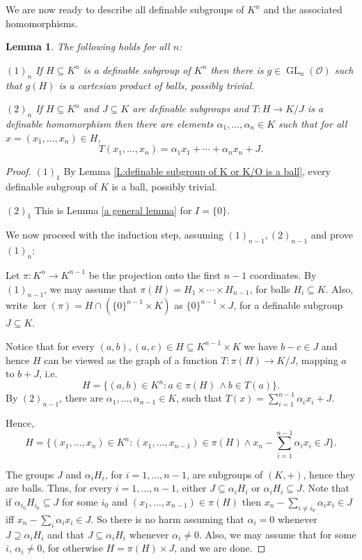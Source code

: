 \documentclass[11pt]{amsart}
\DeclareMathOperator{\gl}{GL} \DeclareMathOperator{\agl}{AGL}
\newtheorem{lemma}[theorem]{Lemma}
\theoremstyle{definition}
\newcommand{\CO}{{\mathcal O}}
\newcommand{\0}{\emptyset}
\def\sub{\subseteq}
\begin{document}
We are now ready to describe all definable subgroups of $K^n$ and the associated homomorphisms.
\begin{lemma} \label{end-groups2}
The following holds for all  $n$:

$(1)_n$ If $H\subseteq K^n$ is a definable subgroup of $K^n$ then there is $g\in \gl_n(\CO)$ such that $g(H)$ is a cartesian product  of balls, possibly trivial. 

$(2)_n$ If $H\subseteq K^n$ and $J\subseteq K$ are definable subgroups and $T:H\to K/J$ is a definable homomorphism then there are elements $\alpha_1,\ldots, \alpha_n\in K$ such that for all $x=(x_1,\ldots, x_n)\in H$, 
\[T(x_1,\ldots,x_n)=\alpha_1x_1+\cdots+\alpha_nx_n+J.\]
\end{lemma}
\begin{proof}
$(1)_1$ By Lemma \ref{L:definable subgroup of K or K/O is a ball}, every definable subgroup of $K$ is a ball, possibly trivial.

$(2)_1$ This is  Lemma \ref{a general lemma} for $I=\{0\}$.

We now proceed with the induction step, assuming $(1)_{n-1}, (2)_{n-1}$ and prove $(1)_{n}$: 

Let $\pi:K^n\to K^{n-1}$  be the projection onto the first $n-1$ coordinates. By $(1)_{n-1}$, we may assume that $\pi(H)=H_1\times \cdots \times H_{n-1}$, for balls $H_i\subseteq K$.   Also, write $\ker(\pi)=H\cap (\{0\}^{n-1}\times K)$ as $\{0\}^{n-1}\times J$, for a definable subgroup $J\subseteq K$. 

 Notice that for every $(a,b), (a,c)\in H\sub K^{n-1}\times K$ we have $b-c\in J$ and hence $H$ can be viewed as the graph of a function $T:\pi(H) \to K/J$, mapping $a$ to $b+J$, i.e.
 \[H=\{(a,b)\in K^n:a\in \pi(H)\, \wedge b\in T(a)\}. \]
 By $(2)_{n-1}$, there are $\alpha_1,\ldots, \alpha_{n-1}\in K$, such that $T(x)=\sum_{i=1}^{n-1}\alpha_ix_i+J$.

Hence, 
\[H=\{(x_1,\ldots, x_n)\in K^n: (x_1,\ldots, x_{n-1})\in \pi(H) \wedge x_n-\sum_{i=1}^{n-1} \alpha_i x_i\in J\}. \]
 
 The groups $J$ and $\alpha_iH_i$, for $i=1,\ldots, n-1$, are subgroups of $(K,+)$, hence they are balls. Thus, for every $i=1,\ldots, n-1$,  either $J\sub \alpha_i H_i$ or $\alpha_i H_i\sub J$.  Note that if $\alpha_{i_0} H_{i_0}\sub J$ for some $i_0$  and $(x_1,\dots, x_{n-1})\in \pi(H)$ then $x_n-\sum\limits_{i\neq i_0} \alpha_i x_i\in J$ iff $x_n-\sum\limits_i \alpha_ix_i\in J$.  So there is no harm assuming that $\alpha_i=0$ whenever $J\supseteq \alpha_i H_i$  and that $J\sub \alpha_i H_i$ whenever $\alpha_i\neq 0$. 
Also, we may assume that for some $i$,  $\alpha_i\neq 0$, for otherwise $H=\pi(H)\times J$, and we are done.


\end{proof}
\end{document}
